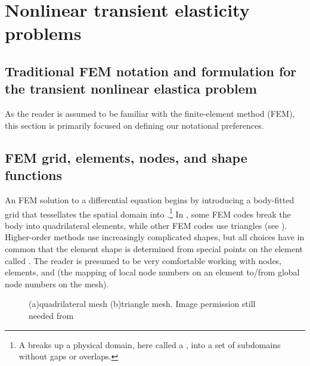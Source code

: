 



\section{Nonlinear transient \twoD elasticity problems}
\renewcommand{\gradNBFa}{\AArray{G}}%
\subsection{Traditional FEM notation and formulation for the transient nonlinear \twoD elastica problem}

As the reader is assumed to be familiar with the finite-element method (FEM), this section is primarily focused on defining our notational preferences. 

\subsection{\twoD FEM grid, elements, nodes, and shape functions}
An FEM solution to a differential equation begins by introducing a body-fitted grid that tessellates the spatial domain into .\footnote{A  breaks up a physical domain, here called a , into a set of subdomains without gaps or overlaps.} 
%
In \twoD, some FEM codes break the body into quadrilateral elements, while other FEM codes use triangles (see ). Higher-order methods use increasingly complicated shapes, but all choices have in common that the element shape is determined from special points on the element called . The reader is presumed to be very comfortable working with nodes, elements, and  (\ie the mapping of local node numbers on an element to/from global node numbers on the mesh).





\begin{figure}
\caption{(a)quadrilateral mesh (b)triangle mesh. Image permission still needed from \cite{Khoei2008}}
\label{fig:QuadAndTriangleMesh}
\end{figure}



